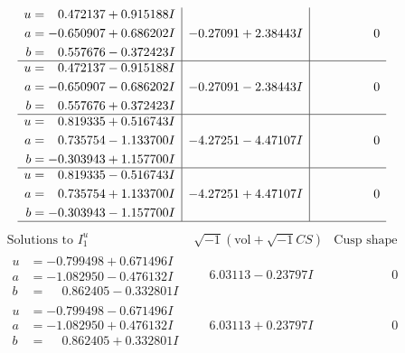 \documentclass[1p]{elsarticle_modified}
\theoremstyle{definition}
\newcommand{\I}{\sqrt{-1}}
\begin{document}
$$\begin{array}{c|c|c}
\begin{aligned}
u &= \phantom{-}0.472137 + 0.915188 I \\
a &= -0.650907 + 0.686202 I \\
b &= \phantom{-}0.557676 - 0.372423 I\end{aligned}
 & -0.27091 + 2.38443 I & \phantom{-0.000000 } 0 \\ \hline\begin{aligned}
u &= \phantom{-}0.472137 - 0.915188 I \\
a &= -0.650907 - 0.686202 I \\
b &= \phantom{-}0.557676 + 0.372423 I\end{aligned}
 & -0.27091 - 2.38443 I & \phantom{-0.000000 } 0 \\ \hline\begin{aligned}
u &= \phantom{-}0.819335 + 0.516743 I \\
a &= \phantom{-}0.735754 - 1.133700 I \\
b &= -0.303943 + 1.157700 I\end{aligned}
 & -4.27251 - 4.47107 I & \phantom{-0.000000 } 0 \\ \hline\begin{aligned}
u &= \phantom{-}0.819335 - 0.516743 I \\
a &= \phantom{-}0.735754 + 1.133700 I \\
b &= -0.303943 - 1.157700 I\end{aligned}
 & -4.27251 + 4.47107 I & \phantom{-0.000000 } 0\\
 \hline 
 \end{array}$$\newpage$$\begin{array}{c|c|c}  
\text{Solutions to }I^u_{1}& \I (\text{vol} + \sqrt{-1}CS) & \text{Cusp shape}\\
 \hline 
\begin{aligned}
u &= -0.799498 + 0.671496 I \\
a &= -1.082950 - 0.476132 I \\
b &= \phantom{-}0.862405 - 0.332801 I\end{aligned}
 & \phantom{-}6.03113 - 0.23797 I & \phantom{-0.000000 } 0 \\ \hline\begin{aligned}
u &= -0.799498 - 0.671496 I \\
a &= -1.082950 + 0.476132 I \\
b &= \phantom{-}0.862405 + 0.332801 I\end{aligned}
 & \phantom{-}6.03113 + 0.23797 I & \phantom{-0.000000 } 0 \\ \hline\begin{aligned}

\end{aligned}
\end{array}$$
\end{document}
